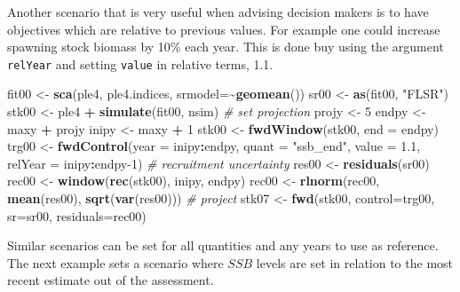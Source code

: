 \documentclass[
]{book}
\newenvironment{Shaded}{\begin{snugshade}}{\end{snugshade}}
\newcommand{\AttributeTok}[1]{\textcolor[rgb]{0.13,0.29,0.53}{#1}}
\newcommand{\CommentTok}[1]{\textcolor[rgb]{0.56,0.35,0.01}{\textit{#1}}}
\newcommand{\DecValTok}[1]{\textcolor[rgb]{0.00,0.00,0.81}{#1}}
\newcommand{\FloatTok}[1]{\textcolor[rgb]{0.00,0.00,0.81}{#1}}
\newcommand{\FunctionTok}[1]{\textcolor[rgb]{0.13,0.29,0.53}{\textbf{#1}}}
\newcommand{\NormalTok}[1]{#1}
\newcommand{\OtherTok}[1]{\textcolor[rgb]{0.56,0.35,0.01}{#1}}
\newcommand{\SpecialCharTok}[1]{\textcolor[rgb]{0.81,0.36,0.00}{\textbf{#1}}}
\newcommand{\StringTok}[1]{\textcolor[rgb]{0.31,0.60,0.02}{#1}}
\begin{document}
Another scenario that is very useful when advising decision makers is to have objectives which are relative to previous values. For example one could increase spawning stock biomass by 10\% each year. This is done buy using the argument \texttt{relYear} and setting \texttt{value} in relative terms, 1.1.

\begin{Shaded}
\begin{Highlighting}[]
\NormalTok{fit00 }\OtherTok{\textless{}{-}} \FunctionTok{sca}\NormalTok{(ple4, ple4.indices, }\AttributeTok{srmodel=}\SpecialCharTok{\textasciitilde{}}\FunctionTok{geomean}\NormalTok{())}
\NormalTok{sr00 }\OtherTok{\textless{}{-}} \FunctionTok{as}\NormalTok{(fit00, }\StringTok{"FLSR"}\NormalTok{)}
\NormalTok{stk00 }\OtherTok{\textless{}{-}}\NormalTok{ ple4 }\SpecialCharTok{+} \FunctionTok{simulate}\NormalTok{(fit00, nsim)}
\CommentTok{\# set projection}
\NormalTok{projy }\OtherTok{\textless{}{-}} \DecValTok{5}
\NormalTok{endpy }\OtherTok{\textless{}{-}}\NormalTok{ maxy }\SpecialCharTok{+}\NormalTok{ projy}
\NormalTok{inipy }\OtherTok{\textless{}{-}}\NormalTok{ maxy }\SpecialCharTok{+} \DecValTok{1}
\NormalTok{stk00 }\OtherTok{\textless{}{-}} \FunctionTok{fwdWindow}\NormalTok{(stk00, }\AttributeTok{end =}\NormalTok{ endpy)}
\NormalTok{trg00 }\OtherTok{\textless{}{-}} \FunctionTok{fwdControl}\NormalTok{(}\AttributeTok{year =}\NormalTok{ inipy}\SpecialCharTok{:}\NormalTok{endpy, }\AttributeTok{quant =} \StringTok{"ssb\_end"}\NormalTok{, }\AttributeTok{value =} \FloatTok{1.1}\NormalTok{, }\AttributeTok{relYear =}\NormalTok{ inipy}\SpecialCharTok{:}\NormalTok{endpy}\DecValTok{{-}1}\NormalTok{)}
\CommentTok{\# recruitment uncertainty}
\NormalTok{res00 }\OtherTok{\textless{}{-}} \FunctionTok{residuals}\NormalTok{(sr00)}
\NormalTok{rec00 }\OtherTok{\textless{}{-}} \FunctionTok{window}\NormalTok{(}\FunctionTok{rec}\NormalTok{(stk00), inipy, endpy)}
\NormalTok{rec00 }\OtherTok{\textless{}{-}} \FunctionTok{rlnorm}\NormalTok{(rec00, }\FunctionTok{mean}\NormalTok{(res00), }\FunctionTok{sqrt}\NormalTok{(}\FunctionTok{var}\NormalTok{(res00)))}
\CommentTok{\# project}
\NormalTok{stk07 }\OtherTok{\textless{}{-}} \FunctionTok{fwd}\NormalTok{(stk00, }\AttributeTok{control=}\NormalTok{trg00, }\AttributeTok{sr=}\NormalTok{sr00, }\AttributeTok{residuals=}\NormalTok{rec00)}
\end{Highlighting}
\end{Shaded}

Similar scenarios can be set for all quantities and any years to use as reference. The next example sets a scenario where \(SSB\) levels are set in relation to the most recent estimate out of the assessment.
\end{document}
